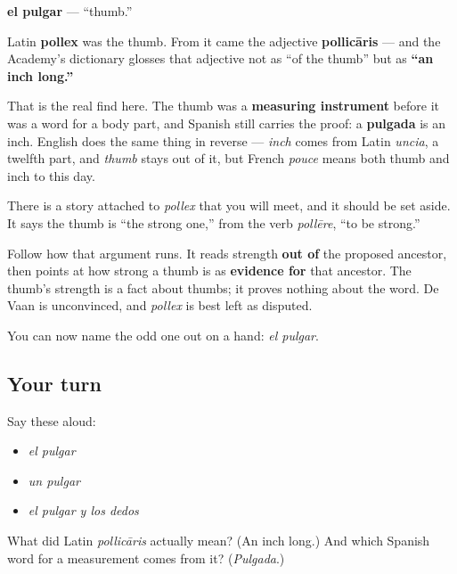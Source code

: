\begin{cousinweb}
\textbf{el pulgar} — \textquotedblleft{}thumb.\textquotedblright{}

Latin \textbf{pollex} was the thumb. From it came the adjective \textbf{pollicāris} — and the Academy's dictionary glosses that adjective not as \textquotedblleft{}of the thumb\textquotedblright{} but as \textbf{\textquotedblleft{}an inch long.\textquotedblright{}}

That is the real find here. The thumb was a \textbf{measuring instrument} before it was a word for a body part, and Spanish still carries the proof: a \textbf{pulgada} is an inch. English does the same thing in reverse — \emph{inch} comes from Latin \emph{uncia}, a twelfth part, and \emph{thumb} stays out of it, but French \emph{pouce} means both thumb and inch to this day.

There is a story attached to \emph{pollex} that you will meet, and it should be set aside. It says the thumb is \textquotedblleft{}the strong one,\textquotedblright{} from the verb \emph{pollēre}, \textquotedblleft{}to be strong.\textquotedblright{}

Follow how that argument runs. It reads strength \textbf{out of} the proposed ancestor, then points at how strong a thumb is as \textbf{evidence for} that ancestor. The thumb's strength is a fact about thumbs; it proves nothing about the word. De Vaan is unconvinced, and \emph{pollex} is best left as disputed.
\end{cousinweb}

\begin{grammarlens}[title={What you've built}]
You can now name the odd one out on a hand: \emph{el pulgar}.
\end{grammarlens}

\subsection*{Your turn}
Say these aloud:

\begin{itemize}
\raggedright
  \item \emph{el pulgar}
  \item \emph{un pulgar}
  \item \emph{el pulgar y los dedos}
\end{itemize}

\begin{tcolorbox}[breakable,colback=teal!4,colframe=teal!35!black,title={Before you move on}]
What did Latin \emph{pollicāris} actually mean? (An inch long.) And which Spanish word for a measurement comes from it? (\emph{Pulgada}.)
\end{tcolorbox}
